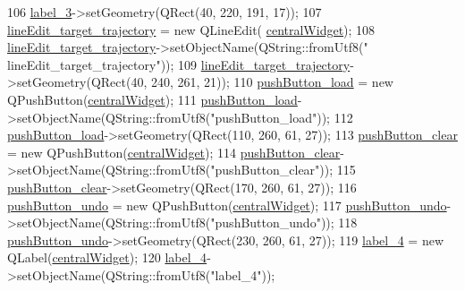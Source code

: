 \begin{DoxyCode}
106         \hyperlink{class_ui___main_window_a0376fd90247280e7c7957cc70628708c}{label\_3}->setGeometry(QRect(40, 220, 191, 17));
107         \hyperlink{class_ui___main_window_a4a75bfb754049f89fccef822cad712d6}{lineEdit\_target\_trajectory} = \textcolor{keyword}{new} QLineEdit(
      \hyperlink{class_ui___main_window_a30075506c2116c3ed4ff25e07ae75f81}{centralWidget});
108         \hyperlink{class_ui___main_window_a4a75bfb754049f89fccef822cad712d6}{lineEdit\_target\_trajectory}->setObjectName(QString::fromUtf8(\textcolor{stringliteral}{"
      lineEdit\_target\_trajectory"}));
109         \hyperlink{class_ui___main_window_a4a75bfb754049f89fccef822cad712d6}{lineEdit\_target\_trajectory}->setGeometry(QRect(40, 240, 261, 21));
110         \hyperlink{class_ui___main_window_a67832089879377ce16b3f26fbb2cc3f2}{pushButton\_load} = \textcolor{keyword}{new} QPushButton(\hyperlink{class_ui___main_window_a30075506c2116c3ed4ff25e07ae75f81}{centralWidget});
111         \hyperlink{class_ui___main_window_a67832089879377ce16b3f26fbb2cc3f2}{pushButton\_load}->setObjectName(QString::fromUtf8(\textcolor{stringliteral}{"pushButton\_load"}));
112         \hyperlink{class_ui___main_window_a67832089879377ce16b3f26fbb2cc3f2}{pushButton\_load}->setGeometry(QRect(110, 260, 61, 27));
113         \hyperlink{class_ui___main_window_a5d7af3b0fdbc605e3fd8ae6ceffa0d29}{pushButton\_clear} = \textcolor{keyword}{new} QPushButton(\hyperlink{class_ui___main_window_a30075506c2116c3ed4ff25e07ae75f81}{centralWidget});
114         \hyperlink{class_ui___main_window_a5d7af3b0fdbc605e3fd8ae6ceffa0d29}{pushButton\_clear}->setObjectName(QString::fromUtf8(\textcolor{stringliteral}{"pushButton\_clear"}));
115         \hyperlink{class_ui___main_window_a5d7af3b0fdbc605e3fd8ae6ceffa0d29}{pushButton\_clear}->setGeometry(QRect(170, 260, 61, 27));
116         \hyperlink{class_ui___main_window_ab3fd048b1a1dee328d8e1b433955bf29}{pushButton\_undo} = \textcolor{keyword}{new} QPushButton(\hyperlink{class_ui___main_window_a30075506c2116c3ed4ff25e07ae75f81}{centralWidget});
117         \hyperlink{class_ui___main_window_ab3fd048b1a1dee328d8e1b433955bf29}{pushButton\_undo}->setObjectName(QString::fromUtf8(\textcolor{stringliteral}{"pushButton\_undo"}));
118         \hyperlink{class_ui___main_window_ab3fd048b1a1dee328d8e1b433955bf29}{pushButton\_undo}->setGeometry(QRect(230, 260, 61, 27));
119         \hyperlink{class_ui___main_window_a78c7e10730b43c6700cd7216911ed76a}{label\_4} = \textcolor{keyword}{new} QLabel(\hyperlink{class_ui___main_window_a30075506c2116c3ed4ff25e07ae75f81}{centralWidget});
120         \hyperlink{class_ui___main_window_a78c7e10730b43c6700cd7216911ed76a}{label\_4}->setObjectName(QString::fromUtf8(\textcolor{stringliteral}{"label\_4"}));

\end{DoxyCode}
